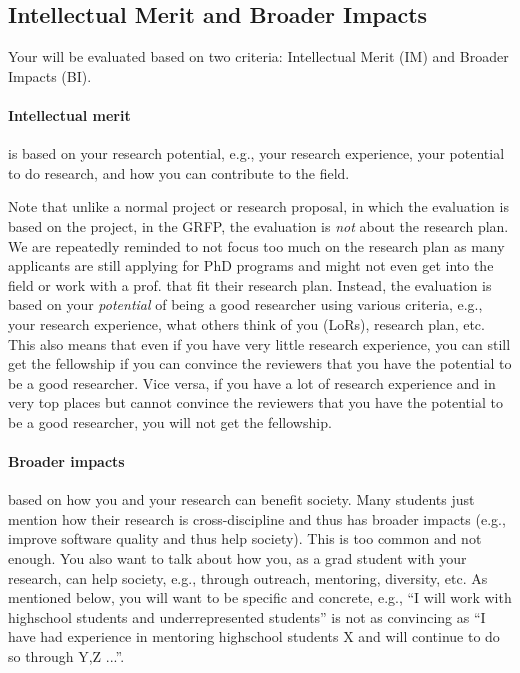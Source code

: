 \documentclass[oneside,11pt,dvipsnames]{book}
\begin{document}
\subsection{Intellectual Merit and Broader Impacts}
Your will be evaluated based on two criteria: Intellectual Merit (IM) and Broader Impacts (BI). 

\paragraph{Intellectual merit} is based on your research potential, e.g., your research experience, your potential to do research, and how you can contribute to the field. 

Note that unlike a normal project or research proposal, in which the evaluation is based on the project, in the GRFP, the evaluation is \emph{not} about the research plan. We are repeatedly reminded to not focus too much on the research plan as many applicants are still applying for PhD programs and might not even get into the field or work with a prof. that fit their research plan.  Instead, the evaluation is based on your \emph{potential} of being a good researcher using various criteria, e.g., your research experience, what others think of you (LoRs), research plan, etc. This also means that even if you have very little research experience, you can still get the fellowship if you can convince the reviewers that you have the potential to be a good researcher.  Vice versa, if you have a lot of research experience and in very top places but cannot convince the reviewers that you have the potential to be a good researcher, you will not get the fellowship.

\paragraph{Broader impacts} based on how you and your research can benefit society.  Many students just mention how their research is cross-discipline and thus has broader impacts (e.g., improve software quality and thus help society).  This is too common and not enough.  You also want to talk about how you, as a grad student with your research, can help society, e.g., through outreach, mentoring, diversity, etc. As mentioned below, you will want to be specific and concrete, e.g., ``I will work with highschool students and underrepresented students'' is not as convincing as ``I have had experience in mentoring highschool students X and will continue to do so through Y,Z ...''.  
\end{document}
